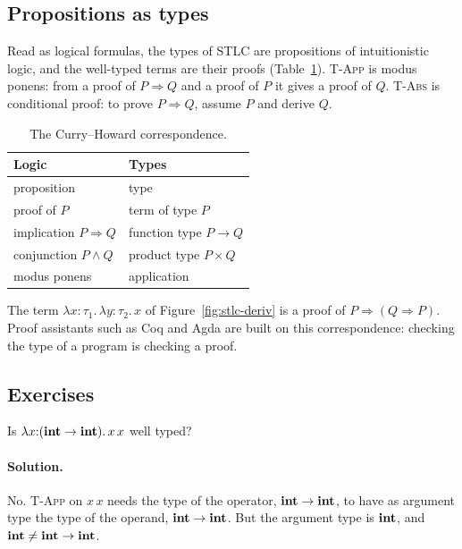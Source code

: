 \subsection{Propositions as types}

Read as logical formulas, the types of STLC are propositions of
intuitionistic logic, and the well-typed terms are their proofs
(Table~\ref{tab:curry-howard}). \textsc{T-App} is modus ponens: from a proof of
$P \Rightarrow Q$ and a proof of $P$ it gives a proof of $Q$. \textsc{T-Abs} is
conditional proof: to prove $P \Rightarrow Q$, assume $P$ and derive $Q$.

\begin{table}[h]
\centering
\small
\begin{tabular}{l l}
  \toprule
  Logic & Types \\
  \midrule
  proposition & type \\
  proof of $P$ & term of type $P$ \\
  implication $P \Rightarrow Q$ & function type $P \to Q$ \\
  conjunction $P \wedge Q$ & product type $P \times Q$ \\
  modus ponens & application \\
  \bottomrule
\end{tabular}
\caption{The Curry--Howard correspondence.}
\label{tab:curry-howard}
\end{table}

The term $\lambda x{:}\tau_1.\, \lambda y{:}\tau_2.\, x$ of Figure~\ref{fig:stlc-deriv}
is a proof of $P \Rightarrow (Q \Rightarrow P)$. Proof assistants such as Coq and
Agda are built on this correspondence: checking the type of a program is
checking a proof.

\subsection{Exercises}

\begin{exercise}
Is $\lambda x{:}(\mathbf{int} \to \mathbf{int}).\, x\, x$ well typed?
\end{exercise}

\paragraph{Solution.} No. \textsc{T-App} on $x\, x$ needs the type of the operator,
$\mathbf{int} \to \mathbf{int}$, to have as argument type the type of the operand,
$\mathbf{int} \to \mathbf{int}$. But the argument type is $\mathbf{int}$, and $\mathbf{int} \ne \mathbf{int} \to \mathbf{int}$.

